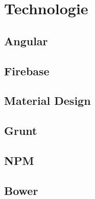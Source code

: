 \chapter{Technologie}
\section{Angular}
\section{Firebase}
\section{Material Design}
\section{Grunt}
\section{NPM}
\section{Bower}
